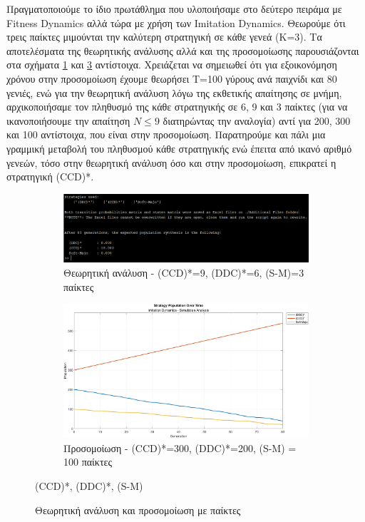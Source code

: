 \documentclass[a4paper,12pt]{article}
\begin{document}
Πραγματοποιούμε το ίδιο πρωτάθλημα που υλοποιήσαμε στο δεύτερο πειράμα με \foreignlanguage{english}{Fitness Dynamics} αλλά τώρα με χρήση των \foreignlanguage{english}{Imitation Dynamics}. Θεωρούμε ότι τρεις παίκτες μιμούνται την καλύτερη στρατηγική σε κάθε γενεά (Κ=3). Τα αποτελέσματα της θεωρητικής ανάλυσης αλλά και της προσομοίωσης παρουσιάζονται στα σχήματα \ref{fig:imi_the2} και \ref{fig:imi_sim2} αντίστοιχα. Χρειάζεται να σημειωθεί ότι για εξοικονόμηση χρόνου στην προσομοίωση έχουμε θεωρήσει Τ=100 γύρους ανά παιχνίδι και 80 γενιές, ενώ για την θεωρητική ανάλυση λόγω της εκθετικής απαίτησης σε μνήμη, αρχικοποιήσαμε τον πληθυσμό της κάθε στρατηγικής σε 6, 9 και 3 παίκτες (για να ικανοποιήσουμε την απαίτηση $N\leq9$ διατηρώντας την αναλογία) αντί για 200, 300 και 100 αντίστοιχα, που είναι στην προσομοίωση.
Παρατηρούμε και πάλι μια γραμμική μεταβολή του πληθυσμού κάθε στρατηγικής ενώ έπειτα από ικανό αριθμό γενεών, τόσο στην θεωρητική ανάλυση όσο και στην προσομοίωση, επικρατεί η στρατηγική \foreignlanguage{english}{(CCD)*}.

\begin{figure}[H]
\centering
\begin{subfigure}[b]{0.9\textwidth}
    \centering
    \includegraphics[width=\textwidth]{Graphs/imi_the2.png}
    \caption{Θεωρητική ανάλυση - \foreignlanguage{english}{(CCD)*=9, (DDC)*=6, (S-M)=3} παίκτες}
    \label{fig:imi_the2}
\end{subfigure}
\hfill
\vspace{1em}
\begin{subfigure}[b]{0.9\textwidth}
    \centering
    \includegraphics[width=\textwidth]{Graphs/imi_sim2.png}
    \caption{Προσομοίωση - \foreignlanguage{english}{(CCD)*=300, (DDC)*=200, (S-M) = 100} παίκτες}
    \label{fig:imi_sim2}
\end{subfigure}
\caption{Θεωρητική ανάλυση και προσομοίωση με παίκτες} \foreignlanguage{english}{(CCD)*, (DDC)*, (S-M)}
\end{figure}
\end{document}
